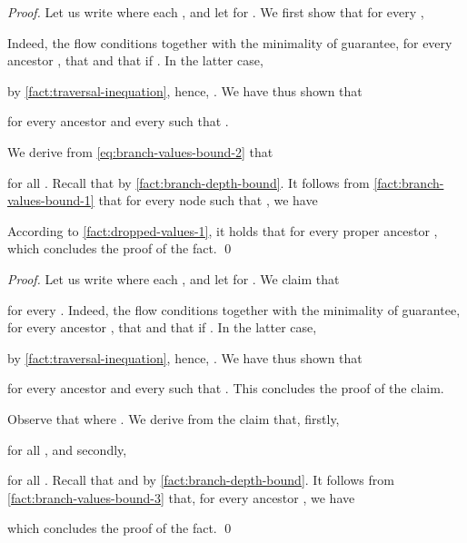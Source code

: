\FactBranchValuesBoundTwo*
\begin{proof}
  Let us write  where each ,
  and let  for .
  We first show that for every ,
  
  Indeed,
  the flow conditions together with
  the minimality of  guarantee,
  for every ancestor ,
  that  and
  that  if .
  In the latter case,
  
  by \cref{fact:traversal-inequation},
  hence,
  .
  We have thus shown that
  
  for every ancestor 
  and every 
  such that .


  We derive from \cref{eq:branch-values-bound-2} that
  
  for all .
  Recall that  by \cref{fact:branch-depth-bound}.
  It follows from \cref{fact:branch-values-bound-1}
  that for every node  such that ,
  we have
  
  According to \cref{fact:dropped-values-1},
  it holds that  for every proper ancestor ,
  which concludes the proof of the fact.
  \qed
\end{proof}

\FactBranchValuesBoundFour*
\begin{proof}
  Let us write  where each ,
  and let  for .
  We claim that
  
  for every .
  Indeed,
  the flow conditions together with
  the minimality of  guarantee,
  for every ancestor ,
  that  and
  that  if .
  In the latter case,
  
  by \cref{fact:traversal-inequation},
  hence,
  .
  We have thus shown that
  
  for every ancestor 
  and every 
  such that .
  This concludes the proof of the claim.

  Observe that  where .
  We derive from the claim that, firstly,
  
  for all ,
  and secondly,
  
  for all .
  Recall that  and  by \cref{fact:branch-depth-bound}.
  It follows from \cref{fact:branch-values-bound-3}
  that,
  for every ancestor ,
  we have
  
  which concludes the proof of the fact.
  \qed
\end{proof}

